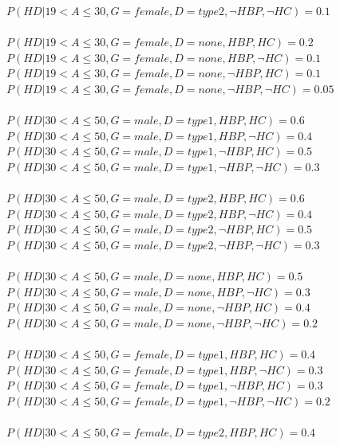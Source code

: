 \documentclass{article}
\begin{document}
$P(HD | 19 < A \leq 30, G = female, D = type2, \neg HBP, \neg HC) = 0.1$\\
\\
$P(HD | 19 < A \leq 30, G = female, D = none, HBP, HC) = 0.2 $\\
$P(HD | 19 < A \leq 30, G = female, D = none, HBP, \neg HC) = 0.1$\\
$P(HD | 19 < A \leq 30, G = female, D = none, \neg HBP, HC) = 0.1$\\
$P(HD | 19 < A \leq 30, G = female, D = none, \neg HBP, \neg HC) = 0.05$\\
\\
$P(HD | 30 < A \leq 50, G = male, D = type1, HBP, HC) = 0.6 $\\
$P(HD | 30 < A \leq 50, G = male, D = type1, HBP, \neg HC) = 0.4$\\
$P(HD | 30 < A \leq 50, G = male, D = type1, \neg HBP, HC) = 0.5$\\
$P(HD | 30 < A \leq 50, G = male, D = type1, \neg HBP, \neg HC) = 0.3$\\
\\
$P(HD | 30 < A \leq 50, G = male, D = type2, HBP, HC) = 0.6$\\
$P(HD | 30 < A \leq 50, G = male, D = type2, HBP, \neg HC) = 0.4$\\
$P(HD | 30 < A \leq 50, G = male, D = type2, \neg HBP, HC) = 0.5$\\
$P(HD | 30 < A \leq 50, G = male, D = type2, \neg HBP, \neg HC) = 0.3$\\
\\
$P(HD | 30 < A \leq 50, G = male, D = none, HBP, HC) = 0.5 $\\
$P(HD | 30 < A \leq 50, G = male, D = none, HBP, \neg HC) = 0.3$\\
$P(HD | 30 < A \leq 50, G = male, D = none, \neg HBP, HC) = 0.4$\\
$P(HD | 30 < A \leq 50, G = male, D = none, \neg HBP, \neg HC) = 0.2$\\
\\
$P(HD | 30 < A \leq 50, G = female, D = type1, HBP, HC) = 0.4 $\\
$P(HD | 30 < A \leq 50, G = female, D = type1, HBP, \neg HC) = 0.3$\\
$P(HD | 30 < A \leq 50, G = female, D = type1, \neg HBP, HC) = 0.3$\\
$P(HD | 30 < A \leq 50, G = female, D = type1, \neg HBP, \neg HC) = 0.2$\\
\\
$P(HD | 30 < A \leq 50, G = female, D = type2, HBP, HC) = 0.4 $\\
\end{document}
